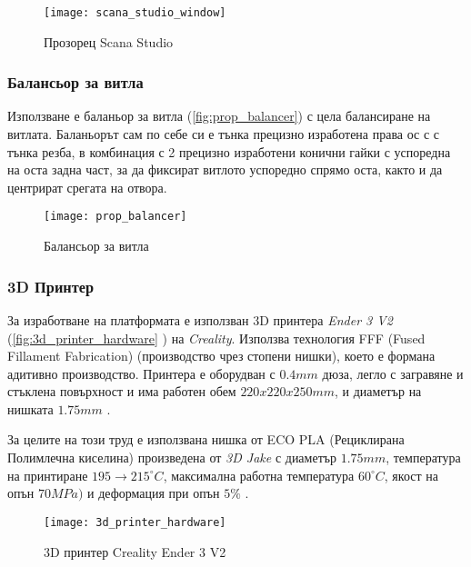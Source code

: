 \begin{figure}[htpb!]
    \centering
    \texttt{[image: scana\_studio\_window]}
    \caption{Прозорец Scana Studio}
    \label{fig:scana_studio_window}
\end{figure}

\FloatBarrier


\subsubsection{Балансьор за витла}
\FloatBarrier


Използване е баланьор за витла (\autoref{fig:prop_balancer}) с цела балансиране на витлата.
Баланьорът сам по себе си е тънка прецизно изработена права ос с с тънка резба, в комбинация с 2 прецизно изработени конични гайки с успоредна на оста задна част,
за да фиксират витлото успоредно спрямо оста, както и да центрират срегата на отвора.
 
\begin{figure}[htpb!]
    \centering
    \texttt{[image: prop\_balancer]}
    \caption{Балансьор за витла}
    \label{fig:prop_balancer}
\end{figure}


\subsubsection{3D Принтер}
\FloatBarrier

За изработване на платформата е използван 3D принтера \textit{Ender 3 V2} (\autoref{fig:3d_printer_hardware} ) на \textit{Creality}.
Използва технология FFF (Fused Fillament Fabrication) (производство чрез стопени нишки), което е формана адитивно производство.
Принтера е оборудван с \(0.4mm\) дюза,
легло с загравяне и стъклена повърхност
и има работен обем \(220x220x250mm\), 
и диаметър на нишката \(1.75mm\) \cite{user_manual_3d_printer}.

За целите на този труд е използвана нишка от ECO PLA (Рециклирана Полимлечна киселина) произведена от \textit{3D Jake} 
с диаметър \(1.75mm\),
температура на принтиране \(195\to215^{\circ}C\), 
максимална работна температура \(60^{\circ}C\),
якост на опън \(70MPa)\)
и деформация при опън \(5\%\) \cite{datasheet_ecopla}.

\begin{figure}[htpb!]
    \centering
    \texttt{[image: 3d\_printer\_hardware]}
    \caption{3D принтер Creality Ender 3 V2}
    \label{fig:3d_printer_hardware}
\end{figure}

